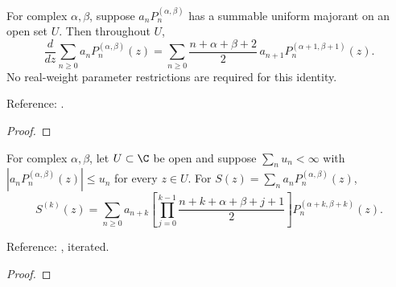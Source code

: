 \begin{theorem}
\label{thm:jacobi-series-differentiation}
\leanok
For complex $\alpha,\beta$, suppose $a_nP_n^{(\alpha,\beta)}$ has a summable
uniform majorant on an open set $U$. Then throughout $U$,
\[
 \frac{d}{dz}\sum_{n\ge0}a_nP_n^{(\alpha,\beta)}(z)
 =\sum_{n\ge0}\frac{n+\alpha+\beta+2}{2}\,a_{n+1}
       P_n^{(\alpha+1,\beta+1)}(z).
\]
No real-weight parameter restrictions are required for this identity.

Reference: \cite[18.9.15]{dlmf}.
\end{theorem}
\begin{proof}
\leanok
\end{proof}

\begin{theorem}
\label{thm:jacobi-series-higher-derivatives}
\leanok
For complex $\alpha,\beta$, let $U\subset\C$ be open and suppose $\sum_n u_n<\infty$ with $|a_nP_n^{(\alpha,\beta)}(z)|\le u_n$ for every $z\in U$. For $S(z)=\sum_n a_nP_n^{(\alpha,\beta)}(z)$,
\[
 S^{(k)}(z)=\sum_{n\ge0}a_{n+k}
 \left[\prod_{j=0}^{k-1}\frac{n+k+\alpha+\beta+j+1}{2}\right]
 P_n^{(\alpha+k,\beta+k)}(z).
\]

Reference: \cite[18.9.15]{dlmf}, iterated.
\end{theorem}
\begin{proof}
\leanok
\end{proof}

